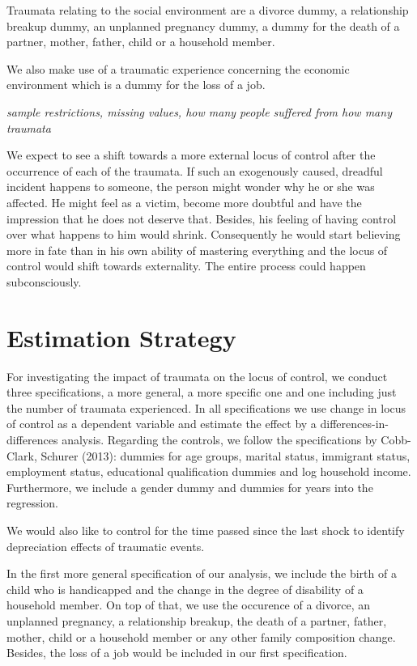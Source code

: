 \documentclass[12pt, a4paper, fleqn, parskip]{scrartcl}
\begin{document}
Traumata relating to the social environment are a divorce dummy, a relationship
breakup dummy, an unplanned pregnancy dummy, a dummy for the death of a
partner, mother, father, child or a household member.

We also make use of a traumatic experience concerning the economic environment
which is a dummy for the loss of a job.

\textit{sample restrictions, missing values, how many people suffered from how
many traumata}

We expect to see a shift towards a more external locus of control after the
occurrence of each of the traumata. If such an exogenously caused, dreadful
incident happens to someone, the person might wonder why he or she was
affected. He might feel as a victim, become more doubtful and have the
impression that he does not deserve that. Besides, his feeling of having
control over what happens to him would shrink. Consequently he would start
believing more in fate than in his own ability of mastering everything and the
locus of control would shift towards externality. The entire process could
happen subconsciously.

\section{Estimation Strategy}

For investigating the impact of traumata on the locus of control, we conduct
three specifications, a more general, a more specific one and one including
just the number of traumata experienced. In all specifications we use change in
locus of control as a dependent variable and estimate the effect by a
differences-in-differences analysis. Regarding the controls, we follow the
specifications by Cobb-Clark, Schurer (2013): dummies for age groups, marital
status, immigrant status, employment status, educational qualification dummies
and log household income. Furthermore, we include a gender dummy and dummies
for years into the regression.

We would also like to control for the time passed since the last shock to
identify depreciation effects of traumatic events.

In the first more general specification of our analysis, we include the birth
of a child who is handicapped and the change in the degree of disability of a
household member. On top of that, we use the occurence of a divorce, an
unplanned pregnancy, a relationship breakup, the death of a partner, father,
mother, child or a household member or any other family composition change.
Besides, the loss of a job would be included in our first specification.
\end{document}
